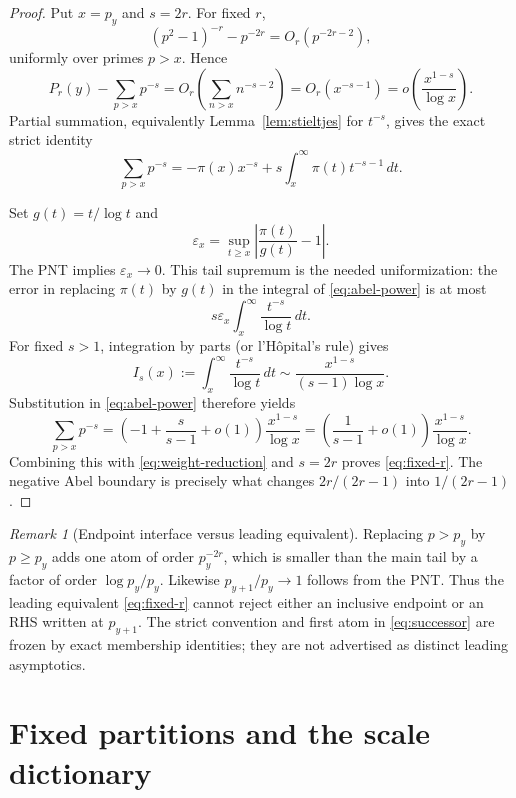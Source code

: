\documentclass[11pt]{article}
\theoremstyle{definition}
\theoremstyle{remark}
\newtheorem{remark}[theorem]{Remark}
\begin{document}
\begin{proof}
Put $x=p_y$ and $s=2r$.  For fixed $r$,
\[
 (p^2-1)^{-r}-p^{-2r}=O_r(p^{-2r-2}),
\]
uniformly over primes $p>x$.  Hence
\begin{equation}
 P_r(y)-\sum_{p>x}p^{-s}
 =O_r\!\left(\sum_{n>x}n^{-s-2}\right)
 =O_r(x^{-s-1})
 =o\!\left(\frac{x^{1-s}}{\log x}\right).
 \label{eq:weight-reduction}
\end{equation}
Partial summation, equivalently Lemma~\ref{lem:stieltjes} for $t^{-s}$,
gives the exact strict identity
\begin{equation}
 \sum_{p>x}p^{-s}
 =-\pi(x)x^{-s}+s\int_x^\infty\pi(t)t^{-s-1}\,dt.
 \label{eq:abel-power}
\end{equation}

Set $g(t)=t/\log t$ and
\[
 \varepsilon_x=\sup_{t\ge x}
 \left|\frac{\pi(t)}{g(t)}-1\right|.
\]
The PNT implies $\varepsilon_x\to0$.  This tail supremum is the needed
uniformization: the error in replacing $\pi(t)$ by $g(t)$ in the integral
of \eqref{eq:abel-power} is at most
\[
 s\varepsilon_x\int_x^\infty\frac{t^{-s}}{\log t}\,dt.
\]
For fixed $s>1$, integration by parts (or l'H\^opital's rule) gives
\begin{equation}
 I_s(x):=\int_x^\infty\frac{t^{-s}}{\log t}\,dt
 \sim\frac{x^{1-s}}{(s-1)\log x}.
 \label{eq:Is}
\end{equation}
Substitution in \eqref{eq:abel-power} therefore yields
\[
 \sum_{p>x}p^{-s}
 =\left(-1+\frac{s}{s-1}+o(1)\right)
   \frac{x^{1-s}}{\log x}
 =\left(\frac{1}{s-1}+o(1)\right)
   \frac{x^{1-s}}{\log x}.
\]
Combining this with \eqref{eq:weight-reduction} and $s=2r$ proves
\eqref{eq:fixed-r}.  The negative Abel boundary is precisely what changes
$2r/(2r-1)$ into $1/(2r-1)$.
\end{proof}

\begin{remark}[Endpoint interface versus leading equivalent]
Replacing $p>p_y$ by $p\ge p_y$ adds one atom of order $p_y^{-2r}$,
which is smaller than the main tail by a factor of order
$\log p_y/p_y$.  Likewise $p_{y+1}/p_y\to1$ follows from the PNT.  Thus
the leading equivalent \eqref{eq:fixed-r} cannot reject either an inclusive
endpoint or an RHS written at $p_{y+1}$.  The strict convention and first
atom in \eqref{eq:successor} are frozen by exact membership identities;
they are not advertised as distinct leading asymptotics.
\end{remark}

\section{Fixed partitions and the scale dictionary}
\end{document}

